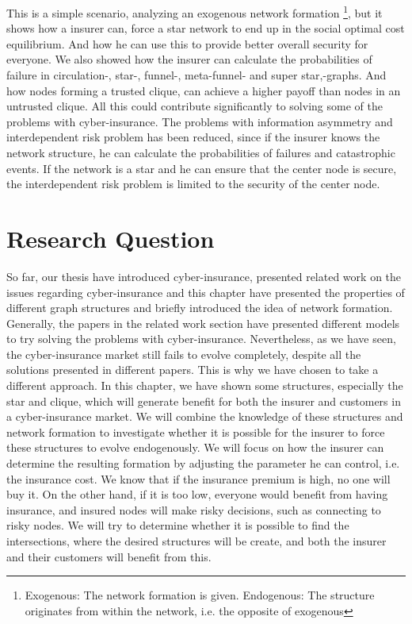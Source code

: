 This is a simple scenario, analyzing an exogenous network formation \footnote{Exogenous: The network formation is given. Endogenous: The structure originates from within the network, i.e. the opposite of exogenous}, 
but it shows how a insurer can, force a star network to end up in the social optimal cost equilibrium. And how he can use this to provide better overall security for everyone. We also showed how the insurer can calculate the probabilities of failure in circulation-, star-, funnel-, meta-funnel- and super star,-graphs.   And how nodes forming a trusted clique, can achieve a higher payoff than nodes in an untrusted clique. 
All this could contribute significantly to solving some of the problems with cyber-insurance. The problems with information asymmetry and interdependent risk problem has been reduced, since if the insurer knows the network structure, he can calculate the probabilities of failures and catastrophic events. If the network is a star and he can ensure that the center node is secure, the interdependent risk problem is limited to the security of the center node. 

\section{Research Question}
So far, our thesis have introduced cyber-insurance, presented related work on the issues regarding cyber-insurance and this chapter have presented the properties of different graph structures and briefly introduced the idea of network formation. Generally, the papers in the related work section have presented different models to try solving the problems with cyber-insurance. Nevertheless, as we have seen, the cyber-insurance market still fails to evolve completely, despite all the solutions presented in different papers. This is why we have chosen to take a different approach.
In this chapter, we have shown some structures, especially the star and clique, which will generate benefit for both the insurer and customers in a cyber-insurance market. We will combine the knowledge of these structures and network formation to investigate whether it is possible for the insurer to force these structures to evolve endogenously. We will focus on how the insurer can determine the resulting formation by adjusting the parameter he can control, i.e. the insurance cost. We know that if the insurance premium is high, no one will buy it. On the other hand, if it is too low, everyone would benefit from having insurance, and insured nodes will make risky decisions, such as connecting to risky nodes. We will try to determine whether it is possible to find the intersections, where the desired structures will be create, and both the insurer and their customers will benefit from this.

